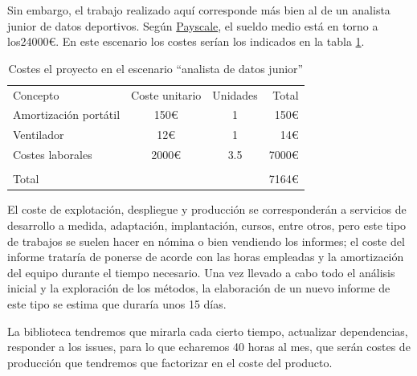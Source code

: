 Sin embargo, el trabajo realizado aquí corresponde más bien al de un analista
junior de datos deportivos. Según \href{https://www.payscale.com/}{Payscale}, el sueldo medio está en torno 
a los24000€. En este escenario los costes serían los indicados en la tabla \ref{tab:costes2}.

\begin{table}
\begin{tabular}[h!tbp]{lccr}
  Concepto & Coste unitario & Unidades & Total \\
  Amortización portátil & 150€ & 1 & 150€ \\
  Ventilador            & 12€  & 1 & 14€ \\
  Costes laborales      & 2000€& 3.5 & 7000€ \\
  \hline \\
  \multicolumn{3}{l}{Total} & 7164€ \\
\end{tabular}
\caption{Costes el proyecto en el escenario ``analista de datos junior''} \label{tab:costes2}
\end{table}

El coste de explotación, despliegue y producción se corresponderán a servicios de 
desarrollo a medida, adaptación, implantación, cursos, entre otros, pero este
tipo de trabajos se suelen hacer en nómina o bien vendiendo los informes; el
coste del informe trataría de ponerse de acorde con las horas empleadas y la
amortización del equipo durante el tiempo necesario. Una vez llevado a cabo todo
el análisis inicial y la exploración de los métodos, la elaboración de un nuevo
informe de este tipo se estima que duraría unos 15 días.

La biblioteca tendremos que 
mirarla cada cierto tiempo, actualizar dependencias, responder a los issues, para lo que echaremos 
40 horas al mes, que serán costes de producción que tendremos que factorizar en el coste del producto.
